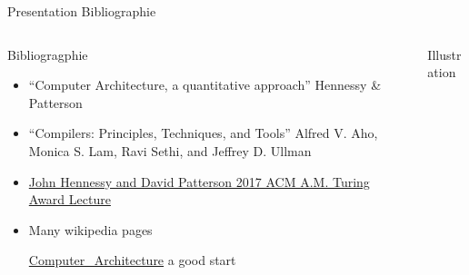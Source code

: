 %
\begin{Frame}{Presentation Bibliographie}
  \begin{columns}[t]
    \begin{column}{.5\textwidth} %
      \begin{block}{Bibliogragphie}\footnotesize
        \begin{itemize}
        \item ``Computer Architecture, a quantitative approach''
          Hennessy \& Patterson
        \item ``Compilers: Principles, Techniques, and Tools'' Alfred
          V. Aho, Monica S. Lam, Ravi Sethi, and Jeffrey D. Ullman
        \item \href{https://www.youtube.com/watch?v=3LVeEjsn8Ts}{John Hennessy and David Patterson 2017 ACM A.M. Turing Award Lecture}
        \item Many wikipedia pages

          \href{https://en.wikipedia.org/wiki/Computer_architecture}{Computer\_Architecture}
          a good start
        \end{itemize}
      \end{block} 
    \end{column}
    
    \begin{column}{.45\textwidth} %
      \begin{block}{Illustration}
        \hfill{}





      \end{block}   
    \end{column}
  \end{columns}  
\end{Frame}


